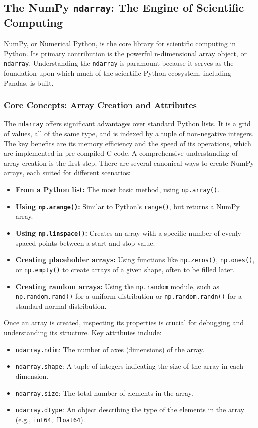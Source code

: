 \documentclass[11pt,a4paper]{article}
\begin{document}
\subsection{The NumPy \texttt{ndarray}: The Engine of Scientific Computing}

NumPy, or Numerical Python, is the core library for scientific computing in Python. Its primary contribution is the powerful n-dimensional array object, or \texttt{ndarray}. Understanding the \texttt{ndarray} is paramount because it serves as the foundation upon which much of the scientific Python ecosystem, including Pandas, is built.

\subsubsection{Core Concepts: Array Creation and Attributes}

The \texttt{ndarray} offers significant advantages over standard Python lists. It is a grid of values, all of the same type, and is indexed by a tuple of non-negative integers. The key benefits are its memory efficiency and the speed of its operations, which are implemented in pre-compiled C code. A comprehensive understanding of array creation is the first step. There are several canonical ways to create NumPy arrays, each suited for different scenarios:

\begin{itemize}
    \item \textbf{From a Python list:} The most basic method, using \texttt{np.array()}.
    \item \textbf{Using \texttt{np.arange()}:} Similar to Python's \texttt{range()}, but returns a NumPy array.
    \item \textbf{Using \texttt{np.linspace()}:} Creates an array with a specific number of evenly spaced points between a start and stop value.
    \item \textbf{Creating placeholder arrays:} Using functions like \texttt{np.zeros()}, \texttt{np.ones()}, or \texttt{np.empty()} to create arrays of a given shape, often to be filled later.
    \item \textbf{Creating random arrays:} Using the \texttt{np.random} module, such as \texttt{np.random.rand()} for a uniform distribution or \texttt{np.random.randn()} for a standard normal distribution.
\end{itemize}

Once an array is created, inspecting its properties is crucial for debugging and understanding its structure. Key attributes include:
\begin{itemize}
    \item \texttt{ndarray.ndim}: The number of axes (dimensions) of the array.
    \item \texttt{ndarray.shape}: A tuple of integers indicating the size of the array in each dimension.
    \item \texttt{ndarray.size}: The total number of elements in the array.
    \item \texttt{ndarray.dtype}: An object describing the type of the elements in the array (e.g., \texttt{int64}, \texttt{float64}).
\end{itemize}
\end{document}
